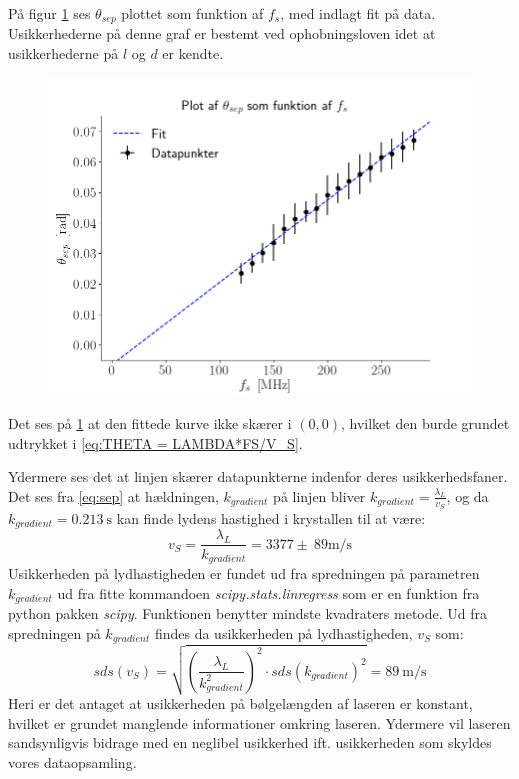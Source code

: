 \documentclass[main]{subfiles}
\begin{document}
På figur \cref{fig:graf1} ses $\theta_{sep}$ plottet som funktion af $f_s$, med indlagt fit på data. Usikkerhederne på denne graf er bestemt ved ophobningsloven idet at usikkerhederne på $l$ og $d$ er kendte.
\begin{figure}[H]
    \centering
    \includegraphics[width=\linewidth]{tegninger/graf1.png}
    \caption{}
    \label{fig:graf1}
\end{figure}
Det ses på \cref{fig:graf1} at den fittede kurve ikke skærer i $(0,0)$, hvilket den burde grundet udtrykket i \cref{eq:THETA = LAMBDA*FS/V_S}.%

Ydermere ses det at linjen skærer datapunkterne indenfor deres usikkerhedsfaner. Det ses fra \cref{eq:sep} at hældningen, $k_{gradient}$ på linjen bliver $ k_{gradient} = \frac{\lambda_L}{v_S}$, og da $k_{gradient} = \SI{0,213}{\second}$ kan finde lydens hastighed i krystallen til at være:
\begin{equation}
  \nonumber v_S = \frac{\lambda_L}{k_{gradient}} = 3377 \pm \ 89 \si{\meter\per\second}
\end{equation}
Usikkerheden på lydhastigheden er fundet ud fra spredningen på parametren $k_{gradient}$ ud fra fitte kommandoen \textsl{scipy.stats.linregress} som er en funktion fra python pakken \textsl{scipy}. Funktionen benytter mindste kvadraters metode. Ud fra spredningen på $k_{gradient}$ findes da usikkerheden på lydhastigheden, $v_S$ som:
\begin{equation}
  \nonumber sds(v_S) = \sqrt{\left(\frac{\lambda_L}{k_{gradient}^2}\right)^2 \cdot sds(k_{gradient})^2} = \SI{89}{\meter\per\second}
\end{equation}
Heri er det antaget at usikkerheden på bølgelængden af laseren er konstant, hvilket er grundet manglende informationer omkring laseren. Ydermere vil laseren sandsynligvis bidrage med en neglibel usikkerhed ift. usikkerheden som skyldes vores dataopsamling.
\end{document}
